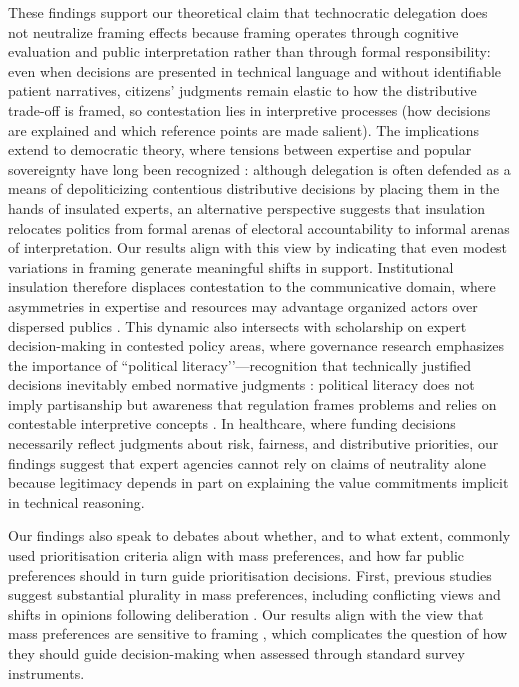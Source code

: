 \documentclass[11pt]{article}\usepackage[]{graphicx}\usepackage[]{xcolor}
\begin{document}
These findings support our theoretical claim that technocratic delegation does not neutralize framing effects because framing operates through cognitive evaluation and public interpretation rather than through formal responsibility: even when decisions are presented in technical language and without identifiable patient narratives, citizens’ judgments remain elastic to how the distributive trade-off is framed, so contestation lies in interpretive processes (how decisions are explained and which reference points are made salient). The implications extend to democratic theory, where tensions between expertise and popular sovereignty have long been recognized \parencite{GausLandwehrSchmalzBruns2020}: although delegation is often defended as a means of depoliticizing contentious distributive decisions by placing them in the hands of insulated experts, an alternative perspective suggests that insulation relocates politics from formal arenas of electoral accountability to informal arenas of interpretation. Our results align with this view by indicating that even modest variations in framing generate meaningful shifts in support. Institutional insulation therefore displaces contestation to the communicative domain, where asymmetries in expertise and resources may advantage organized actors over dispersed publics \parencite{Langvatn2022,Eriksen2020PoliticalLiteracy}. This dynamic also intersects with scholarship on expert decision-making in contested policy areas, where governance research emphasizes the importance of ``political literacy’’—recognition that technically justified decisions inevitably embed normative judgments \parencite{Eriksen2020PoliticalLiteracy}: political literacy does not imply partisanship but awareness that regulation frames problems and relies on contestable interpretive concepts \parencite{Eriksen2020PoliticalLiteracy}. In healthcare, where funding decisions necessarily reflect judgments about risk, fairness, and distributive priorities, our findings suggest that expert agencies cannot rely on claims of neutrality alone because legitimacy depends in part on explaining the value commitments implicit in technical reasoning.



Our findings also speak to debates about whether, and to what extent, commonly used prioritisation criteria align with mass preferences, and how far public preferences should in turn guide prioritisation decisions. First, previous studies suggest substantial plurality in mass preferences, including conflicting views and shifts in opinions following deliberation \parencite{vanExel2015QMethodology,ReckersDroog2020CitizensPanel}. Our results align with the view that mass preferences are sensitive to framing \parencite{Desser2013RareDiseaseFraming,Kangas2014}, which complicates the question of how they should guide decision-making when assessed through standard survey instruments.
\end{document}
